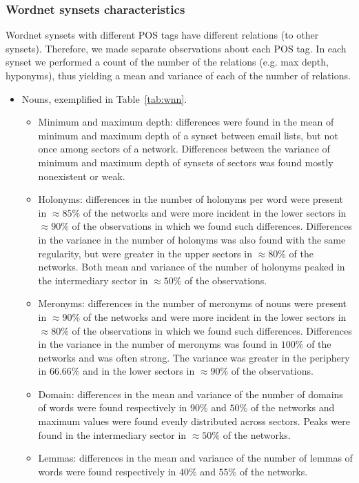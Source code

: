 \subsubsection{Wordnet synsets characteristics}\label{subsec:wn1}
Wordnet synsets with different POS tags have different relations (to other synsets).
Therefore, we made separate observations about each POS tag.
In each synset we performed a count of the number of the relations (e.g. max depth, hyponyms),
thus yielding a mean and variance of each of the number of relations.
\begin{itemize}
\item Nouns, exemplified in Table~\ref{tab:wnn}.
\begin{itemize}
\item Minimum and maximum depth: 
differences were found in the mean of minimum and maximum depth of a synset between email lists,
but not once among sectors of a network.
Differences between the variance of minimum and maximum depth of synsets of sectors was found mostly nonexistent or weak.
\item Holonyms:
differences in the number of holonyms per word were present in $\approx 85\%$ of the networks and were
more incident in the lower sectors in $\approx 90\%$ of the observations in which we found such differences.
Differences in the variance in the number of holonyms was also found with the same regularity,
but were greater in the upper sectors in $\approx 80\%$ of the networks.
Both mean and variance of the number of holonyms peaked in the intermediary sector in $\approx50\%$ of the observations.
\item Meronyms:
differences in the number of meronyms of nouns were present in $\approx 90\%$ of the networks and were
more incident in the lower sectors in $\approx 80\%$ of the observations in which we found such differences.
Differences in the variance in the number of meronyms was found in $100\%$ of the networks and was often strong.
The variance was greater in the periphery in $66.66\%$ and in the lower sectors in $\approx 90\%$ of the observations.
\item Domain:
differences in the mean and variance of the number of domains of words were found respectively in $90\%$ and $50\%$ of the networks and maximum values were found evenly distributed across sectors.
Peaks were found in the intermediary sector in $\approx 50\%$ of the networks.
\item Lemmas:
differences in the mean and variance of the number of lemmas of words were found respectively in $40\%$ and $55\%$ of the networks.

\end{itemize}
\end{itemize}
